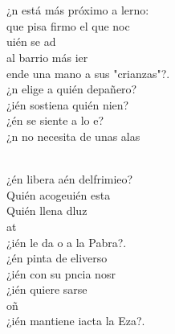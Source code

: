 \documentclass[12pt]{article}
\begin{document}
\begin{multicols*}{2}
\begin{cancion}
\begin{chorus}
	\end{chorus}%
	\jump\\
	   \\
	¿n está más próximo a lerno:  \\
	 que pisa firmo el que noc\\
	uién se ad\\
	al barrio más ier\\
	ende una mano a sus "crianzas"?.\\
	¿n elige a quién depañero?  \\
	¿ién sostiena quién nien? \\
	¿én se siente a lo e? \\
	¿n no necesita de unas alas  \\\jump\\
	\begin{chorus}%
	¿én libera aén delfrimieo? \\
	Quién acogeuién esta\\
	Quién llena dluz \\
	at \\
	¿ién le da o a la Pabra?. \\
	¿én pinta de  eliverso\\
	¿ién con su pncia nosr\\
	¿ién quiere sarse  \\
	oñ \\
	¿ién mantiene iacta la Eza?. \\
	\end{chorus}%
	\jump\\
	     \\
\end{cancion}%


\end{multicols*}
\end{document}
